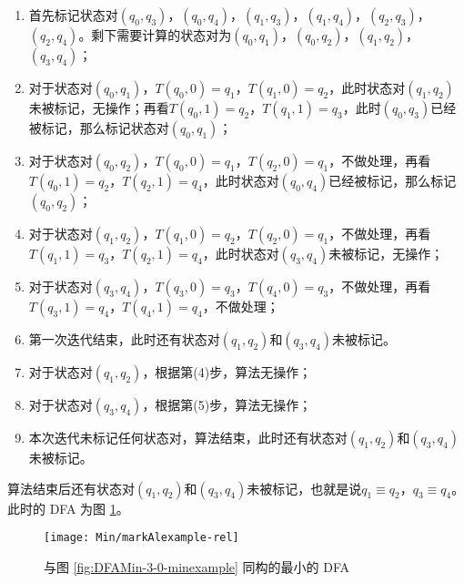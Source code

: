 \begin{enumerate}[(1)]
    \item 首先标记状态对$(q_0,q_3)$，$(q_0,q_4)$，$(q_1,q_3)$，$(q_1,q_4)$，$(q_2,q_3)$，$(q_2,q_4)$。剩下需要计算的状态对为$(q_0,q_1)$，$(q_0,q_2)$，$(q_1,q_2)$，$(q_3,q_4)$；
    \item 对于状态对$(q_0,q_1)$，$T(q_0,0)=q_1$，$T(q_1,0)=q_2$，此时状态对$(q_1,q_2)$未被标记，无操作；再看$T(q_0,1)=q_2$，$T(q_1,1)=q_3$，此时$(q_0,q_3)$已经被标记，那么标记状态对$(q_0,q_1)$；
    \item 对于状态对$(q_0,q_2)$，$T(q_0,0)=q_1$，$T(q_2,0)=q_1$，不做处理，再看$T(q_0,1)=q_2$，$T(q_2,1)=q_4$，此时状态对$(q_0,q_4)$已经被标记，那么标记$(q_0,q_2)$；
    \item 对于状态对$(q_1,q_2)$，$T(q_1,0)=q_2$，$T(q_2,0)=q_1$，不做处理，再看$T(q_1,1)=q_3$，$T(q_2,1)=q_4$，此时状态对$(q_3,q_4)$未被标记，无操作；
    \item 对于状态对$(q_3,q_4)$，$T(q_3,0)=q_3$，$T(q_4,0)=q_3$，不做处理，再看$T(q_3,1)=q_4$，$T(q_4,1)=q_4$，不做处理；
    \item 第一次迭代结束，此时还有状态对$(q_1,q_2)$和$(q_3,q_4)$未被标记。
    \item 对于状态对$(q_1,q_2)$，根据第(4)步，算法无操作；
    \item 对于状态对$(q_3,q_4)$，根据第(5)步，算法无操作；
    \item 本次迭代未标记任何状态对，算法结束，此时还有状态对$(q_1,q_2)$和$(q_3,q_4)$未被标记。
\end{enumerate}

算法结束后还有状态对$(q_1,q_2)$和$(q_3,q_4)$未被标记，也就是说$q_1 \equiv q_2$，$q_3 \equiv q_4$。此时的 DFA 为图 \ref{fig:DFAMin-3-0-minexample-rel}。

\begin{figure}[!htbp]
    \centering
    \texttt{[image: Min/markAlexample-rel]}
    \caption{与图 \ref{fig:DFAMin-3-0-minexample} 同构的最小的 DFA }
    \label{fig:DFAMin-3-0-minexample-rel}
\end{figure}

